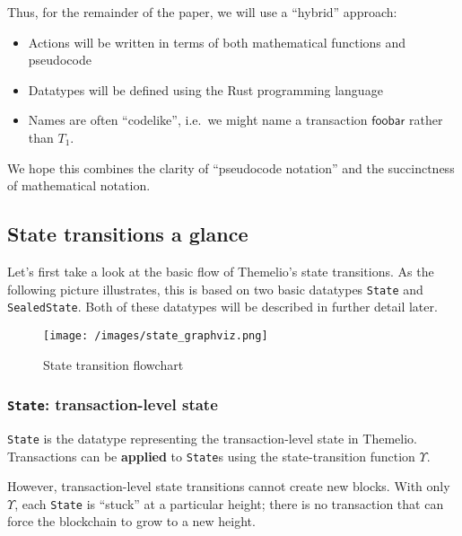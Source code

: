 \documentclass[
]{article}
\newcommand{\passthrough}[1]{#1}
\providecommand{\tightlist}{%
  \setlength{\itemsep}{0pt}\setlength{\parskip}{0pt}}
\begin{document}
Thus, for the remainder of the paper, we will use a ``hybrid'' approach:

\begin{itemize}
  \tightlist
  \item
        Actions will be written in terms of both mathematical functions and
        pseudocode
  \item
        Datatypes will be defined using the Rust programming language
  \item
        Names are often ``codelike'', i.e.~we might name a transaction
        \(\mathsf{foobar}\) rather than \(T_1\).
\end{itemize}

We hope this combines the clarity of ``pseudocode notation'' and the
succinctness of mathematical notation.

\hypertarget{state-transitions-a-glance}{%
  \subsection{State transitions a
    glance}\label{state-transitions-a-glance}}

Let's first take a look at the basic flow of Themelio's state
transitions. As the following picture illustrates, this is based on two
basic datatypes \passthrough{\lstinline!State!} and
\passthrough{\lstinline!SealedState!}. Both of these datatypes will be
described in further detail later.

\begin{figure}
  \centering
  \texttt{[image: /images/state\_graphviz.png]}
  \caption{State transition flowchart}
\end{figure}

\hypertarget{state-transaction-level-state}{%
  \subsubsection{\texorpdfstring{\texttt{State}: transaction-level
      state}{State: transaction-level state}}\label{state-transaction-level-state}}

\passthrough{\lstinline!State!} is the datatype representing the
transaction-level state in Themelio. Transactions can be
\textbf{applied} to \passthrough{\lstinline!State!}s using the
state-transition function \(\Upsilon\).

However, transaction-level state transitions cannot create new blocks.
With only \(\Upsilon\), each \passthrough{\lstinline!State!} is
``stuck'' at a particular height; there is no transaction that can force
the blockchain to grow to a new height.
\end{document}
